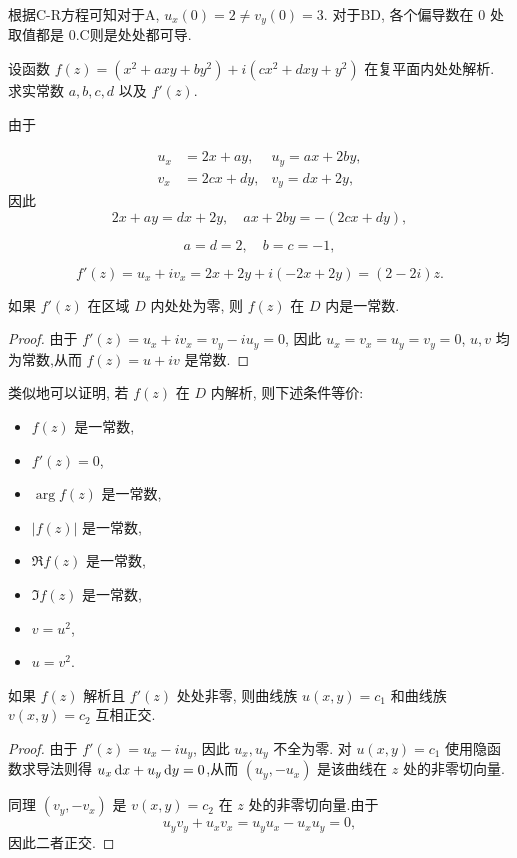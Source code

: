 \documentclass[nocolor,theme=doremi,lang=cn,11pt,chinese,twoside,openright,usesamecnt]{elegantbook}
\begin{document}
\begin{answer}
	根据C-R方程可知对于A, $u_x(0)=2\neq v_y(0)=3$.
	{对于BD, 各个偏导数在 $0$ 处取值都是 $0$.C则是处处都可导.}
\end{answer}

\begin{example}
	设函数 $f(z)=(x^2+axy+by^2)+i(cx^2+dxy+y^2)$ 在复平面内处处解析. 求实常数 $a,b,c,d$ 以及 $f'(z)$.
\end{example}

\begin{solution}
	由于

	\begin{align*}
		u_x&=2x+ay,&u_y=ax+2by,\\
		v_x&=2cx+dy,&v_y=dx+2y,
	\end{align*}
	{因此
		\[2x+ay=dx+2y,\quad ax+2by=-(2cx+dy),\]}

	{
		\[a=d=2,\quad b=c=-1,\]}

	{
		\[f'(z)=u_x+iv_x=2x+2y+i(-2x+2y)=(2-2i)z.\]}
\end{solution}

\begin{example}
	如果 $f'(z)$ 在区域 $D$ 内处处为零, 则 $f(z)$ 在 $D$ 内是一常数.
\end{example}

\begin{proof}
	由于 $f'(z)=u_x+iv_x=v_y-iu_y=0$,
	{因此 $u_x=v_x=u_y=v_y=0$, $u,v$ 均为常数,从而 $f(z)=u+iv$ 是常数.\qedhere}
\end{proof}

类似地可以证明, 若 $f(z)$ 在 $D$ 内解析, 则下述条件等价:
\begin{itemize}
	\item $f(z)$ 是一常数,
	\item $f'(z)=0$,
	\item $\arg{f(z)}$ 是一常数,
	\item $|f(z)|$ 是一常数,
	\item $\Re{f(z)}$ 是一常数,
	\item $\Im{f(z)}$ 是一常数,
	\item $v=u^2$,
	\item $u=v^2$.
\end{itemize}

\begin{example}
	如果 $f(z)$ 解析且 $f'(z)$ 处处非零, 则曲线族 $u(x,y)=c_1$ 和曲线族 $v(x,y)=c_2$ 互相正交.
\end{example}

\begin{proof}
	由于 $f'(z)=u_x-iu_y$, 因此 $u_x,u_y$ 不全为零.
	对 $u(x,y)=c_1$ 使用隐函数求导法则得 $u_x\,\mathrm{d} x+u_y\,\mathrm{d} y=0$,从而 $(u_y,-u_x)$ 是该曲线在 $z$ 处的非零切向量.

	同理 $(v_y,-v_x)$ 是 $v(x,y)=c_2$ 在 $z$ 处的非零切向量.由于
		\[u_yv_y+u_xv_x=u_yu_x-u_xu_y=0,\]
	因此二者正交.
\end{proof}
\end{document}
